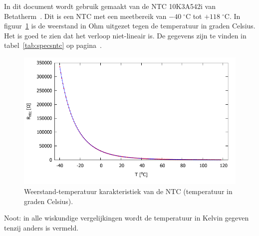 \documentclass[12pt,a4paper,final,twoside,fleqn]{article}
\newcommand{\figscale}{1.0}
\newcommand{\mathcelc}[1]{\mbox{$#1\;^\circ\text{C}$}}
\newcommand{\ntctype}{10K3A542i}
\newcommand{\ntcman}{Betatherm}
\begin{document}
In dit document wordt gebruik gemaakt van de NTC \ntctype{} van
\ntcman~\cite{betatherm10K3A542i}. Dit is een NTC met een meetbereik van
\mathcelc{-40} tot \mathcelc{+118}. In figuur~\ref{fig:ntc_ntc_plot_celsius_fig} is
de weerstand in Ohm uitgezet tegen de temperatuur in graden Celsius.
Het is goed te zien dat het verloop niet-lineair is. De gegevens
zijn te vinden in tabel~\ref{tab:specsntc} op pagina~\pageref{tab:specsntc}.

\begin{figure}[ht!]
\centering
\includegraphics[scale=\figscale]{gnuplot/ntc_ntc_plot_celsius_fig}
\caption[Weerstand-temperatuur karakteristiek van de NTC]{Weerstand-temperatuur karakteristiek van de NTC (temperatuur in graden Celsius).}
\label{fig:ntc_ntc_plot_celsius_fig}
\end{figure}

Noot: in alle wiskundige vergelijkingen wordt de temperatuur in Kelvin
gegeven tenzij anders is vermeld.
\end{document}
